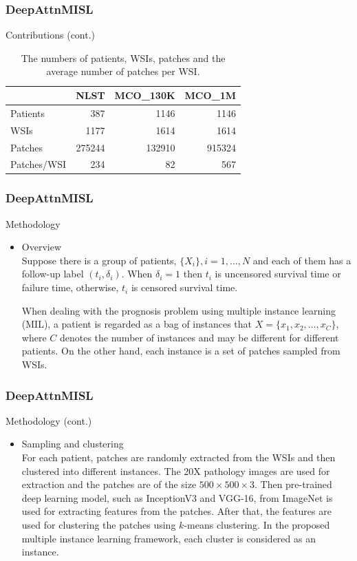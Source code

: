 \documentclass{beamer}
\begin{document}
	\begin{frame}
		\frametitle{DeepAttnMISL}
		Contributions (cont.)
		
		\begin{table}[H]
			\begin{center}
				\begin{tabular}{ | l | r | r | r | }
					\hline
					& NLST & MCO\_130K & MCO\_1M \\
					\hline
					Patients & 387 & 1146 & 1146 \\
					\hline
					WSIs & 1177 & 1614 & 1614 \\
					\hline
					Patches & 275244 & 132910 & 915324 \\
					\hline
					Patches/WSI & 234 & 82 & 567 \\
					\hline
				\end{tabular}
			\end{center}
			\caption{The numbers of patients, WSIs, patches and the average number of patches per WSI.}
		\end{table} 
	\end{frame}

	\begin{frame}
		\frametitle{DeepAttnMISL}
		Methodology
		
		\begin{itemize}
			\item Overview \\
			\vspace{5mm}
			Suppose there is a group of patients, $\{ X_i \}, i = 1, \dots, N$ and each of them has a follow-up label $( t_i, \delta_i )$. When $\delta_i = 1$ then $t_i$ is uncensored survival time or failure time, otherwise, $t_i$ is censored survival time.
			
			When dealing with the prognosis problem using multiple instance learning (MIL), a patient is regarded as a bag of instances that $X = \{ x_1, x_2, \dots, x_C \}$, where $C$ denotes the number of instances and may be different for different patients. On the other hand, each instance is a set of patches sampled from WSIs.
		\end{itemize}
	\end{frame}
	
	\begin{frame}
		\frametitle{DeepAttnMISL}
		Methodology (cont.)
		
		\begin{itemize}
			\item Sampling and clustering \\
			\vspace{5mm}
			For each patient, patches are randomly extracted from the WSIs and then clustered into different instances. The 20X pathology images are used for extraction and the patches are of the size $500 \times 500 \times 3$. Then pre-trained deep learning model, such as InceptionV3 and VGG-16, from ImageNet is used for extracting features from the patches. After that, the features are used for clustering the patches using $k$-means clustering. In the proposed multiple instance learning framework, each cluster is considered as an instance.
		\end{itemize}
	\end{frame}
\end{document}
